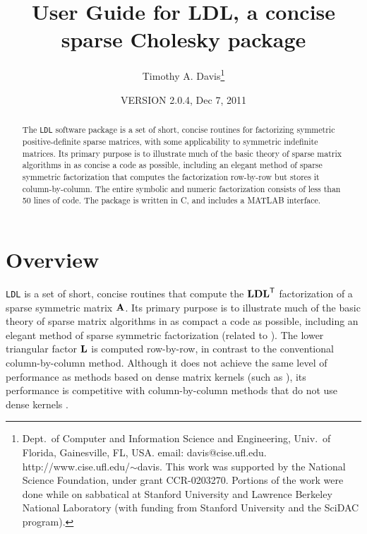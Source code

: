 \documentclass[12pt]{article}
\newcommand{\m}[1]{{\bf{#1}}}       %
\newcommand{\tr}{^{\sf T}}          %
\begin{document}

\title{User Guide for LDL, a concise sparse Cholesky package}
\author{Timothy A. Davis\thanks{
Dept.~of Computer and Information Science and Engineering,
Univ.~of Florida, Gainesville, FL, USA.
email: davis@cise.ufl.edu.
http://www.cise.ufl.edu/$\sim$davis.
This work was supported by the National
Science Foundation, under grant CCR-0203270.
Portions of the work were done while on sabbatical at Stanford University
and Lawrence Berkeley National Laboratory (with funding from Stanford
University and the SciDAC program).
}}

\date{VERSION 2.0.4, Dec 7, 2011}

\maketitle

\begin{abstract}
The {\tt LDL} software package is a set of short, concise routines for
factorizing symmetric positive-definite sparse matrices, with some
applicability to symmetric indefinite matrices.  Its primary purpose is
to illustrate much of the basic theory of sparse matrix algorithms in as
concise a code as possible, including an elegant method
of sparse symmetric factorization that computes the factorization row-by-row
but stores it column-by-column.  The entire symbolic and numeric factorization
consists of less than 50 lines of code.  The package is written in C,
and includes a MATLAB interface.
\end{abstract}

\section{Overview}

{\tt LDL} is a set of short, concise routines that compute the $\m{LDL}\tr$
factorization of a sparse symmetric matrix $\m{A}$.  Its primary purpose is
to illustrate much of the basic theory of sparse matrix algorithms in as
compact a code as possible, including an elegant method of
sparse symmetric factorization (related to \cite{Liu86c,Liu91}).
The lower triangular factor $\m{L}$ is computed row-by-row, in contrast to the
conventional column-by-column method.
Although it does not achieve the same level of performance
as methods based on dense matrix kernels
(such as \cite{NgPeyton93,RothbergGupta91}),
its performance is competitive with column-by-column methods that do not
use dense kernels \cite{GeorgeLiu79, GeorgeLiu, GilbertMolerSchreiber}.
\end{document}
